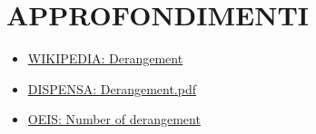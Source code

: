 \documentclass[a4paper,10pt]{article}
\begin{document}
\section{APPROFONDIMENTI}
\begin{itemize}
 \item \href{https://en.wikipedia.org/wiki/Derangement}{WIKIPEDIA: Derangement}
 \item \href{./pdf/DERANGEMENT/derangementLucchini.pdf}{DISPENSA: Derangement.pdf}
 \item \href{http://oeis.org/wiki/Number_of_derangements}{OEIS: Number of derangement}
\end{itemize}




\end{document}
